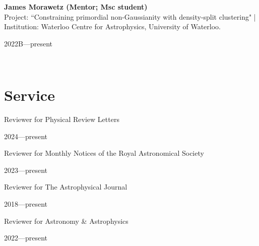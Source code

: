 \documentclass[12pt, a4paper]{article} %
\begin{document}
\begin{minipage}[t]{0.7\textwidth}
\begin{flushleft}%
  \setlength{\leftskip}{0.2cm}%
\textbf{James Morawetz (Mentor; Msc student)}\\
Project: ``Constraining primordial non-Gaussianity with density-split clustering" | Institution: Waterloo Centre for Astrophysics, University of Waterloo.
\end{flushleft}
\end{minipage}
\begin{minipage}[t]{0.3\textwidth}
\hfill 2022B---present
\end{minipage}\\


\section*{Service}

\begin{minipage}[t]{0.7\textwidth}
\begin{flushleft}%
  \setlength{\leftskip}{0.2cm}%
Reviewer for Physical Review Letters
\end{flushleft}
\end{minipage}
\begin{minipage}[t]{0.3\textwidth}
\hfill 2024---present
\end{minipage}

\begin{minipage}[t]{0.7\textwidth}
\begin{flushleft}%
  \setlength{\leftskip}{0.2cm}%
Reviewer for Monthly Notices of the Royal Astronomical Society
\end{flushleft}
\end{minipage}
\begin{minipage}[t]{0.3\textwidth}
\hfill 2023---present
\end{minipage}

\begin{minipage}[t]{0.7\textwidth}
\begin{flushleft}%
  \setlength{\leftskip}{0.2cm}%
Reviewer for The Astrophysical Journal
\end{flushleft}
\end{minipage}
\begin{minipage}[t]{0.3\textwidth}
\hfill 2018---present
\end{minipage}

\begin{minipage}[t]{0.7\textwidth}
\begin{flushleft}%
  \setlength{\leftskip}{0.2cm}%
Reviewer for Astronomy \& Astrophysics
\end{flushleft}
\end{minipage}
\begin{minipage}[t]{0.3\textwidth}
\hfill 2022---present
\end{minipage}\\
\end{document}

